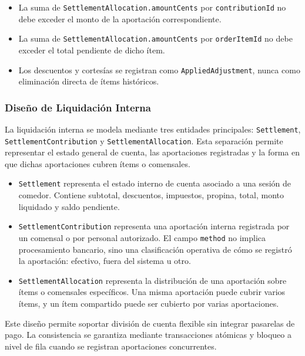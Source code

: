 \begin{itemize}
  \item La suma de \texttt{SettlementAllocation.amountCents} por \texttt{contributionId}
  no debe exceder el monto de la aportación correspondiente.

  \item La suma de \texttt{SettlementAllocation.amountCents} por \texttt{orderItemId}
  no debe exceder el total pendiente de dicho ítem.

  \item Los descuentos y cortesías se registran como \texttt{AppliedAdjustment}, nunca como
  eliminación directa de ítems históricos.
\end{itemize}

\subsubsection{Diseño de Liquidación Interna}

La liquidación interna se modela mediante tres entidades principales: \texttt{Settlement},
\texttt{SettlementContribution} y \texttt{SettlementAllocation}. Esta separación permite
representar el estado general de cuenta, las aportaciones registradas y la forma en que
dichas aportaciones cubren ítems o comensales.

\begin{itemize}
  \item \texttt{Settlement} representa el estado interno de cuenta asociado a una sesión
  de comedor. Contiene subtotal, descuentos, impuestos, propina, total, monto liquidado
  y saldo pendiente.

  \item \texttt{SettlementContribution} representa una aportación interna registrada por
  un comensal o por personal autorizado. El campo \texttt{method} no implica procesamiento
  bancario, sino una clasificación operativa de cómo se registró la aportación: efectivo,
  fuera del sistema u otro.

  \item \texttt{SettlementAllocation} representa la distribución de una aportación sobre
  ítems o comensales específicos. Una misma aportación puede cubrir varios ítems, y un ítem
  compartido puede ser cubierto por varias aportaciones.
\end{itemize}

Este diseño permite soportar división de cuenta flexible sin integrar pasarelas de pago.
La consistencia se garantiza mediante transacciones atómicas y bloqueo a nivel de fila
cuando se registran aportaciones concurrentes.

